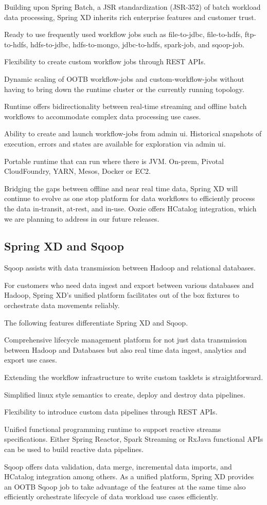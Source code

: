 \begin{itemize*}
\item Building upon Spring Batch, a JSR standardization (JSR-352) of batch workload data processing, Spring XD inherits rich enterprise features and customer trust.
\item Ready to use frequently used workflow jobs such as file-to-jdbc, file-to-hdfs, ftp-to-hdfs, hdfs-to-jdbc, hdfs-to-mongo, jdbc-to-hdfs, spark-job, and sqoop-job.
\item Flexibility to create custom workflow jobs through REST APIs.
\item Dynamic scaling of OOTB workflow-jobs and custom-workflow-jobs without having to bring down the runtime cluster or the currently running topology.
\item Runtime offers bidirectionality between real-time streaming and offline batch workflows to accommodate complex data processing use cases.
\item Ability to create and launch workflow-jobs from admin ui. Historical snapshots of execution, errors and states are available for exploration via admin ui.
\item Portable runtime that can run where there is JVM. On-prem, Pivotal CloudFoundry, YARN, Mesos, Docker or EC2.
\end{itemize*}

Bridging the gaps between offline and near real time data, Spring XD will continue to evolve as one stop platform for data workflows to efficiently process the data in-transit, at-rest, and in-use. Oozie offers HCatalog integration, which we are planning to address in our future releases.

\subsection{Spring XD and Sqoop}
Sqoop assists with data transmission between Hadoop and relational databases.

For customers who need data ingest and export between various databases and Hadoop, Spring XD's unified platform facilitates out of the box fixtures to orchestrate data movements reliably. 

The following features differentiate Spring XD and Sqoop.

\begin{itemize*}
\item Comprehensive lifecycle management platform for not just data transmission between Hadoop and Databases but also real time data ingest, analytics and export use cases.
\item Extending the workflow infrastructure to write custom tasklets is straightforward.
\item Simplified linux style semantics to create, deploy and destroy data pipelines.
\item Flexibility to introduce custom data pipelines through REST APIs.
\item Unified functional programming runtime to support reactive streams specifications. Either Spring Reactor, Spark Streaming or RxJava functional APIs can be used to build reactive data pipelines.
\end{itemize*}

Sqoop offers data validation, data merge, incremental data imports, and HCatalog integration among others. As a unified platform, Spring XD provides an OOTB Sqoop job to take advantage of the features at the same time also efficiently orchestrate lifecycle of data workload use cases efficiently. 
